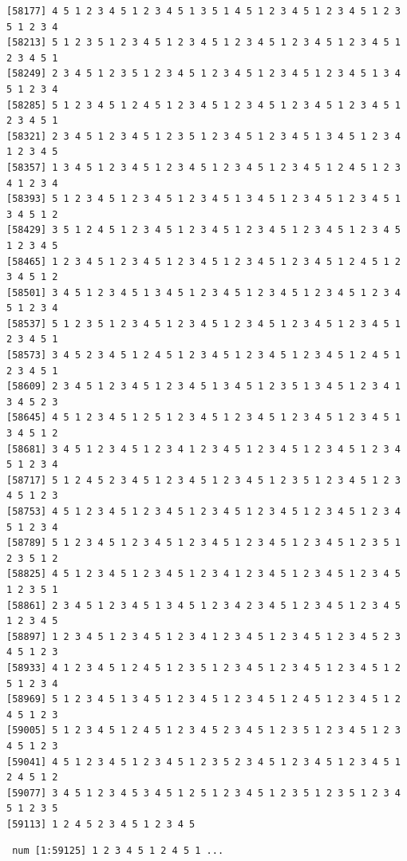 \documentclass[
  english,
]{book}
\newenvironment{Shaded}{\begin{snugshade}}{\end{snugshade}}
\newcommand{\FunctionTok}[1]{\textcolor[rgb]{0.00,0.00,0.00}{#1}}
\newcommand{\NormalTok}[1]{#1}
\newcommand{\SpecialCharTok}[1]{\textcolor[rgb]{0.00,0.00,0.00}{#1}}
\begin{document}
\begin{verbatim}
[58177] 4 5 1 2 3 4 5 1 2 3 4 5 1 3 5 1 4 5 1 2 3 4 5 1 2 3 4 5 1 2 3 5 1 2 3 4
[58213] 5 1 2 3 5 1 2 3 4 5 1 2 3 4 5 1 2 3 4 5 1 2 3 4 5 1 2 3 4 5 1 2 3 4 5 1
[58249] 2 3 4 5 1 2 3 5 1 2 3 4 5 1 2 3 4 5 1 2 3 4 5 1 2 3 4 5 1 3 4 5 1 2 3 4
[58285] 5 1 2 3 4 5 1 2 4 5 1 2 3 4 5 1 2 3 4 5 1 2 3 4 5 1 2 3 4 5 1 2 3 4 5 1
[58321] 2 3 4 5 1 2 3 4 5 1 2 3 5 1 2 3 4 5 1 2 3 4 5 1 3 4 5 1 2 3 4 1 2 3 4 5
[58357] 1 3 4 5 1 2 3 4 5 1 2 3 4 5 1 2 3 4 5 1 2 3 4 5 1 2 4 5 1 2 3 4 1 2 3 4
[58393] 5 1 2 3 4 5 1 2 3 4 5 1 2 3 4 5 1 3 4 5 1 2 3 4 5 1 2 3 4 5 1 3 4 5 1 2
[58429] 3 5 1 2 4 5 1 2 3 4 5 1 2 3 4 5 1 2 3 4 5 1 2 3 4 5 1 2 3 4 5 1 2 3 4 5
[58465] 1 2 3 4 5 1 2 3 4 5 1 2 3 4 5 1 2 3 4 5 1 2 3 4 5 1 2 4 5 1 2 3 4 5 1 2
[58501] 3 4 5 1 2 3 4 5 1 3 4 5 1 2 3 4 5 1 2 3 4 5 1 2 3 4 5 1 2 3 4 5 1 2 3 4
[58537] 5 1 2 3 5 1 2 3 4 5 1 2 3 4 5 1 2 3 4 5 1 2 3 4 5 1 2 3 4 5 1 2 3 4 5 1
[58573] 3 4 5 2 3 4 5 1 2 4 5 1 2 3 4 5 1 2 3 4 5 1 2 3 4 5 1 2 4 5 1 2 3 4 5 1
[58609] 2 3 4 5 1 2 3 4 5 1 2 3 4 5 1 3 4 5 1 2 3 5 1 3 4 5 1 2 3 4 1 3 4 5 2 3
[58645] 4 5 1 2 3 4 5 1 2 5 1 2 3 4 5 1 2 3 4 5 1 2 3 4 5 1 2 3 4 5 1 3 4 5 1 2
[58681] 3 4 5 1 2 3 4 5 1 2 3 4 1 2 3 4 5 1 2 3 4 5 1 2 3 4 5 1 2 3 4 5 1 2 3 4
[58717] 5 1 2 4 5 2 3 4 5 1 2 3 4 5 1 2 3 4 5 1 2 3 5 1 2 3 4 5 1 2 3 4 5 1 2 3
[58753] 4 5 1 2 3 4 5 1 2 3 4 5 1 2 3 4 5 1 2 3 4 5 1 2 3 4 5 1 2 3 4 5 1 2 3 4
[58789] 5 1 2 3 4 5 1 2 3 4 5 1 2 3 4 5 1 2 3 4 5 1 2 3 4 5 1 2 3 5 1 2 3 5 1 2
[58825] 4 5 1 2 3 4 5 1 2 3 4 5 1 2 3 4 1 2 3 4 5 1 2 3 4 5 1 2 3 4 5 1 2 3 5 1
[58861] 2 3 4 5 1 2 3 4 5 1 3 4 5 1 2 3 4 2 3 4 5 1 2 3 4 5 1 2 3 4 5 1 2 3 4 5
[58897] 1 2 3 4 5 1 2 3 4 5 1 2 3 4 1 2 3 4 5 1 2 3 4 5 1 2 3 4 5 2 3 4 5 1 2 3
[58933] 4 1 2 3 4 5 1 2 4 5 1 2 3 5 1 2 3 4 5 1 2 3 4 5 1 2 3 4 5 1 2 5 1 2 3 4
[58969] 5 1 2 3 4 5 1 3 4 5 1 2 3 4 5 1 2 3 4 5 1 2 4 5 1 2 3 4 5 1 2 4 5 1 2 3
[59005] 5 1 2 3 4 5 1 2 4 5 1 2 3 4 5 2 3 4 5 1 2 3 5 1 2 3 4 5 1 2 3 4 5 1 2 3
[59041] 4 5 1 2 3 4 5 1 2 3 4 5 1 2 3 5 2 3 4 5 1 2 3 4 5 1 2 3 4 5 1 2 4 5 1 2
[59077] 3 4 5 1 2 3 4 5 3 4 5 1 2 5 1 2 3 4 5 1 2 3 5 1 2 3 5 1 2 3 4 5 1 2 3 5
[59113] 1 2 4 5 2 3 4 5 1 2 3 4 5
\end{verbatim}

\begin{Shaded}
\end{Shaded}

\begin{verbatim}
 num [1:59125] 1 2 3 4 5 1 2 4 5 1 ...
\end{verbatim}
\end{document}
